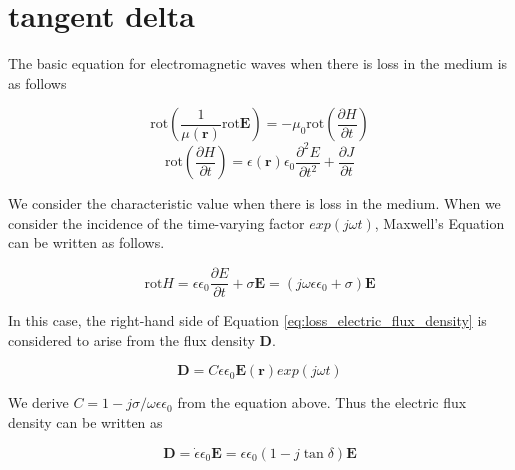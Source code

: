 \documentclass[a4paper,11pt]{jsarticle}
\begin{document}
\title{}
\author{}
\date{\today}
\maketitle

\section{tangent delta}

The basic equation for electromagnetic waves
when there is loss in the medium is as follows

\begin{equation}
  \mathrm{rot}(\frac{1}{\mu(\boldsymbol{r})}\mathrm{rot}\boldsymbol{E}) = -\mu_0 \mathrm{rot}(\frac{\partial H}{\partial t})
\end{equation}
\begin{equation}
  \mathrm{rot}(\frac{\partial H}{\partial t}) = \epsilon(\boldsymbol{r})\epsilon_0 \frac{\partial^2 E}{\partial t^2} + \frac{\partial J}{\partial t}
\end{equation}


We consider the characteristic value when there is loss in the medium.
When we consider the incidence of the time-varying factor $exp(j\omega t)$,
Maxwell's Equation can be written as follows.

\begin{equation} \label{eq:loss_electric_flux_density}
  \mathrm{rot} H = \epsilon \epsilon_0 \frac{\partial E}{\partial t} + \sigma \boldsymbol{E} = (j\omega\epsilon\epsilon_0 + \sigma)\boldsymbol{E}
\end{equation}

In this case, the right-hand side of Equation \ref{eq:loss_electric_flux_density}
is considered to arise from the flux density $\boldsymbol{D}$.

\begin{equation} \label{eq:electric_flux_density}
  \boldsymbol{D} = C\epsilon \epsilon_0 \boldsymbol{E}(\boldsymbol{r})exp(j\omega t)
\end{equation}

We derive $C=1 - j\sigma / \omega\epsilon\epsilon_0$ from the equation above.
Thus the electric flux density can be written as

\begin{equation} \label{eq:electric_flux_density_tangent_delta}
  \boldsymbol{D} = \dot{\epsilon} \epsilon_0 \boldsymbol{E} = \epsilon \epsilon_0 (1 - j\tan\delta)\boldsymbol{E}
\end{equation}
\end{document}
